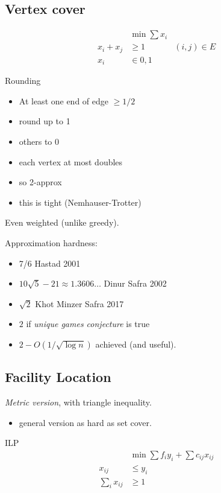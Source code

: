 \documentclass{article}
\begin{document}

\subsection{Vertex cover}
 
\begin{align*}
&\min \sum x_i\\
x_i+x_j &\ge 1& (i,j)\in E\\
x_i&\in{0,1}
\end{align*}

Rounding
\begin{itemize}
\item At least one end of edge $\ge 1/2$
\item round up to 1
\item others to 0
\item each vertex at most doubles
\item so 2-approx
\item this is tight (Nemhauser-Trotter)
\end{itemize}

Even weighted (unlike greedy).

Approximation hardness:
\begin{itemize}
\item 7/6 Hastad 2001
\item $10\sqrt{5} -21 \approx 1.3606\ldots$ Dinur Safra 2002
\item $\sqrt{2}$ Khot Minzer Safra 2017
\item $2$ if \emph{unique games conjecture} is true
\item $2-O(1/\sqrt{\log n})$ achieved (and useful).  
\end{itemize}

\subsection*{Facility Location}

\emph{Metric version}, with triangle inequality.
\begin{itemize}
\item general version as hard as set cover.
\end{itemize}

ILP
\begin{align*}
&\min \sum f_iy_i + \sum c_{ij}x_{ij}\\
x_{ij} &\le y_i\\
\sum_i x_{ij} &\ge 1
\end{align*}
\end{document}

